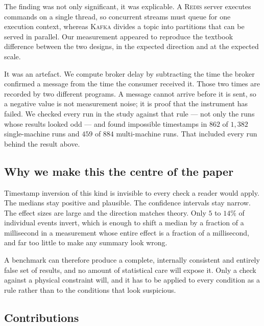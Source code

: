 \documentclass[Afour,sageh,times]{sagej}
\newcommand{\redis}{\textsc{Redis}}
\newcommand{\kafka}{\textsc{Kafka}}
\begin{document}
The finding was not only significant, it was explicable. A \redis{} server executes commands on a
single thread, so concurrent streams must queue for one execution context, whereas \kafka{}
divides a topic into partitions that can be served in parallel. Our measurement appeared to
reproduce the textbook difference between the two designs, in the expected direction and at the
expected scale.

It was an artefact. We compute broker delay by subtracting the time the broker confirmed a
message from the time the consumer received it. Those two times are recorded by two different
programs. A message cannot arrive before it is sent, so a negative value is not measurement
noise; it is proof that the instrument has failed. We checked every run in the study against that
rule --- not only the runs whose results looked odd --- and found impossible timestamps in $862$
of $1{,}382$ single-machine runs and $459$ of $884$ multi-machine runs. That included every run
behind the result above.

\subsection{Why we make this the centre of the paper}

Timestamp inversion of this kind is invisible to every check a reader would apply. The medians
stay positive and plausible. The confidence intervals stay narrow. The effect sizes are large and
the direction matches theory. Only $5$ to $14\%$ of individual events invert, which is enough to
shift a median by a fraction of a millisecond in a measurement whose entire effect is a fraction
of a millisecond, and far too little to make any summary look wrong.

A benchmark can therefore produce a complete, internally consistent and entirely false set of
results, and no amount of statistical care will expose it. Only a check against a physical
constraint will, and it has to be applied to every condition as a rule rather than to the
conditions that look suspicious.

\subsection{Contributions}
\end{document}
